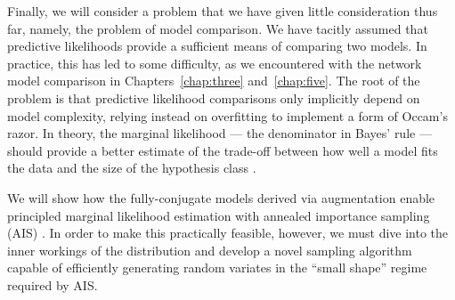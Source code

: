 Finally, we will consider a problem that we have given little
consideration thus far, namely, the problem of model
comparison.  We have tacitly assumed that predictive likelihoods
provide a sufficient means of comparing two models. In practice, this
has led to some difficulty, as we encountered with the network model
comparison in Chapters~\ref{chap:three} and~\ref{chap:five}. The root of the problem is that
predictive likelihood comparisons only implicitly depend on model
complexity, relying instead on overfitting to implement a form of Occam's
razor.  In theory, the marginal likelihood --- the denominator in
Bayes' rule --- should provide a better estimate of the trade-off
between how well a model fits the data and the size of the hypothesis
class  \citep{kass1995bayes}.

We will show how the fully-conjugate models derived via \polyagamma
augmentation enable principled marginal likelihood estimation
with annealed importance sampling (AIS) \citep{neal2001annealed}. In order
to make this practically feasible, however, we must dive into the
inner workings of the \polyagamma distribution and develop a novel sampling
algorithm capable of efficiently generating random variates in the
``small shape'' regime required by AIS. 
 
 
